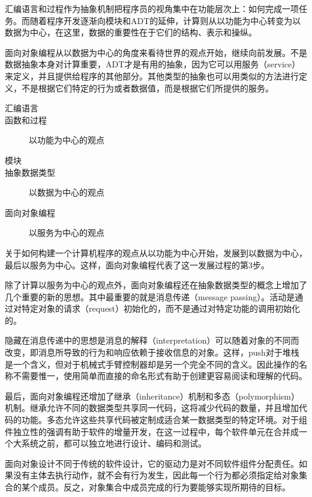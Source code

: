 汇编语言和过程作为抽象机制把程序员的视角集中在功能层次上：如何完成一项任务。而随着程序开发逐渐向模块和ADT的延伸，计算则从以功能为中心转变为以数据为中心，在这里，数据的重要性在于它们的结构、表示和操纵。

面向对象编程从以数据为中心的角度来看待世界的观点开始，继续向前发展。不是数据抽象本身对计算重要，ADT才是有用的抽象，因为它可以用服务（service）来定义，并且提供给程序的其他部分。其他类型的抽象也可以用类似的方法进行定义，不是根据它们特定的行为或者数据值，而是根据它们所提供的服务。

\begin{description}
\item[汇编语言]
\item[函数和过程]	

以功能为中心的观点
\item[模块]
\item[抽象数据类型]

以数据为中心的观点
\item[面向对象编程]

以服务为中心的观点
\end{description}

关于如何构建一个计算机程序的观点从以功能为中心开始，发展到以数据为中心，最后以服务为中心。这样，面向对象编程代表了这一发展过程的第3步。

除了计算以服务为中心的观点外，面向对象编程还在抽象数据类型的概念上增加了几个重要的新的思想。其中最重要的就是消息传递（message passing）。活动是通过对特定对象的请求（request）初始化的，而不是通过对特定功能的调用初始化的。


隐藏在消息传递中的思想是消息的解释（interpretation）可以随着对象的不同而改变，即消息所导致的行为和响应依赖于接收信息的对象。这样，push对于堆栈是一个含义，但对于机械式手臂控制器却是另一个完全不同的含义。因此操作的名称不需要惟一，使用简单而直接的命名形式有助于创建更容易阅读和理解的代码。

最后，面向对象编程还增加了继承（inheritance）机制和多态（polymorphism）机制。继承允许不同的数据类型共享同一代码，这将减少代码的数量，并且增加代码的功能。多态允许这些共享代码被定制成适合某一数据类型的特定环境。对于组件独立性的强调有助于软件的增量开发，在这一过程中，每个软件单元在合并成一个大系统之前，都可以独立地进行设计、编码和测试。

面向对象设计不同于传统的软件设计，它的驱动力是对不同软件组件分配责任。如果没有主体去执行动作，就不会有行为发生，因此每一个行为都必须指定给对象集合的某个成员。反之，对象集合中成员完成的行为要能够实现所期待的目标。






















